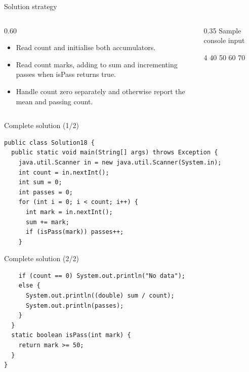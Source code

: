 \documentclass[10pt,aspectratio=169]{beamer}
\begin{document}
\begin{frame}[fragile,t]{Solution strategy}
\begin{columns}[T,onlytextwidth]\begin{column}{0.60\textwidth}
\begin{itemize}
\item Read count and initialise both accumulators.
\item Read count marks, adding to sum and incrementing passes when isPass returns true.
\item Handle count zero separately and otherwise report the mean and passing count.
\end{itemize}
\end{column}\begin{column}{0.35\textwidth}\small
Sample console input\par 4 40 50 60 70\par 
\end{column}\end{columns}
\end{frame}

\begin{frame}[fragile,t]{Complete solution (1/2)}
\begin{lstlisting}
public class Solution18 {
  public static void main(String[] args) throws Exception {
    java.util.Scanner in = new java.util.Scanner(System.in);
    int count = in.nextInt();
    int sum = 0;
    int passes = 0;
    for (int i = 0; i < count; i++) {
      int mark = in.nextInt();
      sum += mark;
      if (isPass(mark)) passes++;
    }
\end{lstlisting}
\end{frame}

\begin{frame}[fragile,t]{Complete solution (2/2)}
\begin{lstlisting}
    if (count == 0) System.out.println("No data");
    else {
      System.out.println((double) sum / count);
      System.out.println(passes);
    }
  }
  static boolean isPass(int mark) {
    return mark >= 50;
  }
}
\end{lstlisting}
\end{frame}
\end{document}
